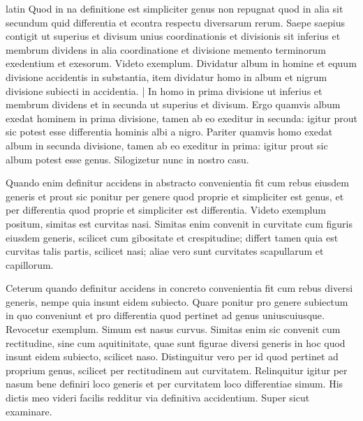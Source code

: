 \begin{otherlanguage*}{latin}
\pstart
Quod in na definitione est simpliciter genus non repugnat quod in alia sit secundum quid differentia et econtra respectu diversarum rerum. Saepe saepius contigit ut superius et divisum unius coordinationis et divisionis sit inferius et membrum dividens in alia coordinatione et divisione memento terminorum exedentium et exesorum. Videto exemplum. Dividatur album in homine et equum divisione accidentis in substantia, item dividatur homo in album et nigrum divisione subiecti in accidentia. \textnormal{|} In homo in prima divisione ut inferius et membrum dividens et in secunda ut superius et divisum. Ergo quamvis album exedat hominem in prima divisione, tamen ab eo exeditur in secunda:
igitur prout sic potest esse differentia hominis albi a nigro. Pariter quamvis homo exedat album in secunda divisione, tamen ab eo exeditur in prima:
igitur prout sic album potest esse genus. Silogizetur nunc in nostro casu. 
\pend

\pstart
Quando enim definitur accidens in abstracto convenientia fit cum rebus eiusdem generis et prout sic ponitur per genere quod proprie et simpliciter est genus, et per differentia quod proprie et simpliciter est differentia. Videto exemplum positum, simitas est curvitas nasi. Simitas enim convenit in curvitate cum figuris eiusdem generis, scilicet cum gibositate et crespitudine; differt tamen quia est curvitas talis partis, scilicet nasi; aliae vero sunt curvitates scapullarum et capillorum. 
\pend

\pstart
Ceterum quando definitur accidens in concreto convenientia fit cum rebus diversi generis, nempe quia insunt eidem subiecto. Quare ponitur pro genere subiectum in quo conveniunt et pro differentia quod pertinet ad genus uniuscuiusque. Revocetur exemplum. Simum est nasus curvus. Simitas enim sic convenit cum rectitudine, sine cum aquitinitate, quae sunt figurae diversi generis in hoc quod insunt eidem subiecto, scilicet naso. Distinguitur vero per id quod pertinet ad proprium genus, scilicet per rectitudinem aut curvitatem. Relinquitur igitur per nasum bene definiri loco generis et per curvitatem loco differentiae simum. His dictis meo videri facilis redditur via definitiva accidentium. Super sicut examinare. 
\pend

\pstart
{}
\pend


\end{otherlanguage*}
